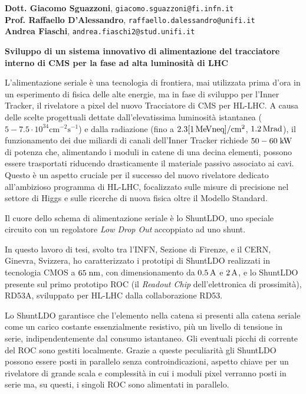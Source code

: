 \documentclass[a4paper,12pt,italian]{article}
\begin{document}

\pagestyle{plain}
\noindent

 {\bf Dott. Giacomo Sguazzoni}, {\tt giacomo.sguazzoni@fi.infn.it}\\
 {\bf Prof. Raffaello D'Alessandro}, {\tt raffaello.dalessandro@unifi.it}\\
 {\bf Andrea Fiaschi}, {\tt andrea.fiaschi2@stud.unifi.it}

\vskip 0.5cm

\noindent \textbf{Sviluppo di un sistema innovativo di alimentazione del tracciatore interno di CMS per la fase ad alta luminosità di LHC}

\vskip 0.5cm

 L'alimentazione seriale \`e una tecnologia di frontiera, mai utilizzata prima d'ora in un esperimento di fisica delle alte energie, ma in fase di sviluppo per l'Inner Tracker, il rivelatore a pixel del nuovo Tracciatore di CMS per HL-LHC. A causa delle scelte progettuali dettate dall'elevatissima luminosit\`a istantanea ($\mathrm{5-7.5\cdot 10^{34}cm^{-2}s^{-1}}$) e dalla radiazione (fino a $\mathrm{2.3 [1{\rm \, Me\kern-0.125em V} neq]/cm^2}$, $1.2{\rm \, Mrad}$), il funzionamento dei due miliardi di canali dell'Inner Tracker richiede $50-60\rm \; kW$ di potenza che, alimentando i moduli in catene di una decina elementi, possono essere trasportati riducendo drasticamente il materiale passivo associato ai cavi. Questo \`e un aspetto cruciale per il successo del nuovo rivelatore dedicato all'ambizioso programma di HL-LHC, focalizzato sulle misure di precisione nel settore di Higgs e sulle ricerche di nuova fisica oltre il Modello Standard.

Il cuore dello schema di alimentazione seriale \`e lo ShuntLDO, uno speciale circuito con un regolatore \textit{Low Drop Out} accoppiato ad uno shunt. 

In questo lavoro di tesi, svolto tra l'INFN, Sezione di Firenze, e il CERN, Ginevra, Svizzera, ho caratterizzato i prototipi di ShuntLDO realizzati in tecnologia CMOS a $65\rm \; nm$, con dimensionamento da $0.5\rm \, A$ e $2\rm \, A$, e lo ShuntLDO presente sul primo prototipo ROC (il \textit{Readout Chip} dell'elettronica di prossimit\`a), RD53A, sviluppato per HL-LHC dalla collaborazione RD53. 

Lo ShuntLDO garantisce che l'elemento nella catena si presenti alla catena seriale come un carico costante essenzialmente resistivo, pi\`u un livello di tensione in serie, indipendentemente dal consumo istantaneo. Gli eventuali picchi di corrente del ROC sono gestiti localmente.
Grazie a queste peculiarit\`a gli ShuntLDO possono essere posti in parallelo senza controindicazioni, aspetto chiave per un rivelatore di grande scala e complessit\`a in cui i moduli pixel verranno posti in serie ma, su questi, i singoli ROC sono alimentati in parallelo.
 
\end{document}
